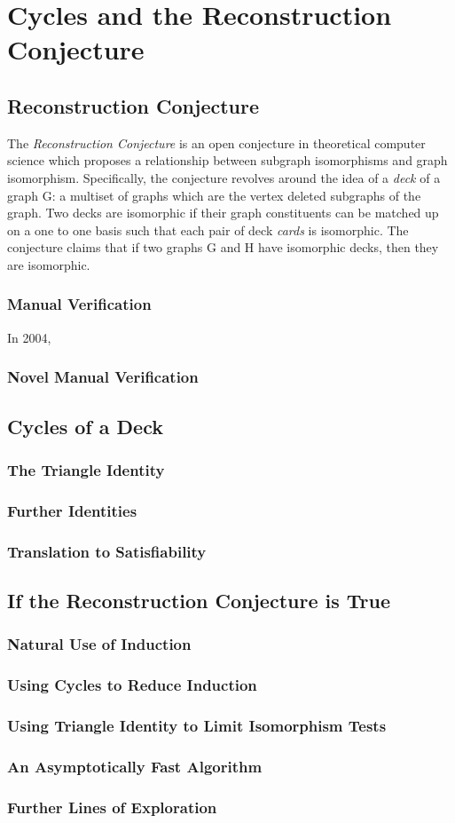 \chapter{Cycles and the Reconstruction Conjecture}

\section{Reconstruction Conjecture}

The \emph{Reconstruction Conjecture} is an open conjecture in theoretical computer science which proposes a relationship between subgraph isomorphisms and graph isomorphism.
Specifically, the conjecture revolves around the idea of a \emph{deck} of a graph G: a multiset of graphs which are the vertex deleted subgraphs of the graph.
Two decks are isomorphic if their graph constituents can be matched up on a one to one basis such that each pair of deck \emph{cards} is isomorphic.
The conjecture claims that if two graphs G and H have isomorphic decks, then they are isomorphic.

\subsection{Manual Verification}

In 2004, 
\subsection{Novel Manual Verification}

\section{Cycles of a Deck}
\subsection{The Triangle Identity}
\subsection{Further Identities}
\subsection{Translation to Satisfiability}

\section{If the Reconstruction Conjecture is True}
\subsection{Natural Use of Induction}
\subsection{Using Cycles to Reduce Induction}
\subsection{Using Triangle Identity to Limit Isomorphism Tests}
\subsection{An Asymptotically Fast Algorithm}
\subsection{Further Lines of Exploration}